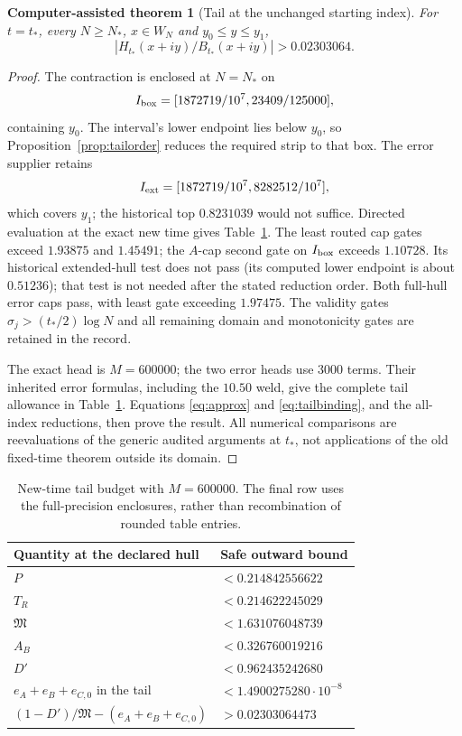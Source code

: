 \documentclass[11pt]{article}
\newtheorem{certtheorem}[theorem]{Computer-assisted theorem}
\theoremstyle{remark}
\newcommand{\tstar}{t_*}
\newcommand{\Nstar}{N_*}
\numberwithin{equation}{section}
\begin{document}
\begin{certtheorem}[Tail at the unchanged starting index]\label{thm:tail}
For $t=\tstar$, every $N\ge\Nstar$, $x\in W_N$ and $y_0\le y\le y_1$,
\begin{equation}\label{eq:tailmargin}
 \left|H_{\tstar}(x+iy)/B_{\tstar}(x+iy)\right|>0.02303064.
\end{equation}
\end{certtheorem}
\begin{proof}
The contraction is enclosed at $N=\Nstar$ on
\[
 I_{\rm box}=[1872719/10^7,23409/125000],
\]
containing $y_0$. The interval's lower endpoint lies below $y_0$, so
Proposition~\ref{prop:tailorder} reduces the required strip to that box.
The error supplier retains
\[
 I_{\rm ext}=[1872719/10^7,8282512/10^7],
\]
which covers $y_1$; the historical top $0.8231039$ would not suffice.
Directed evaluation at the exact new time gives Table~\ref{tab:tail}.
The least routed cap gates exceed $1.93875$ and $1.45491$; the
$A$-cap second gate on $I_{\rm box}$ exceeds $1.10728$. Its historical
extended-hull test does not pass (its computed lower endpoint is about
$0.51236$); that test is not needed after the stated reduction order.
Both full-hull error caps pass, with least gate exceeding $1.97475$.
The validity gates $\sigma_j>(\tstar/2)\log N$ and all remaining domain
and monotonicity gates are retained in the record.

The exact head is $M=600000$; the two error heads use 3000 terms. Their
inherited error formulas, including the $10.50$ weld, give the complete
tail allowance in Table~\ref{tab:tail}. Equations
\eqref{eq:approx} and \eqref{eq:tailbinding}, and the all-index reductions,
then prove the result. All numerical comparisons are reevaluations of
the generic audited arguments at $\tstar$, not applications of the old
fixed-time theorem outside its domain.
\end{proof}

\begin{table}[htbp]
\centering
\begin{tabular}{ll}
\toprule
Quantity at the declared hull & Safe outward bound\\
\midrule
$P$ & $<0.214842556622$\\
$T_R$ & $<0.214622245029$\\
$\mathfrak M$ & $<1.631076048739$\\
$A_B$ & $<0.326760019216$\\
$D'$ & $<0.962435242680$\\
$e_A+e_B+e_{C,0}$ in the tail & $<1.4900275280\cdot10^{-8}$\\
$(1-D')/\mathfrak M-(e_A+e_B+e_{C,0})$
 & $>0.02303064473$\\
\bottomrule
\end{tabular}
\caption{New-time tail budget with $M=600000$. The final row uses the
full-precision enclosures, rather than recombination of rounded table entries.}
\label{tab:tail}
\end{table}
\end{document}

